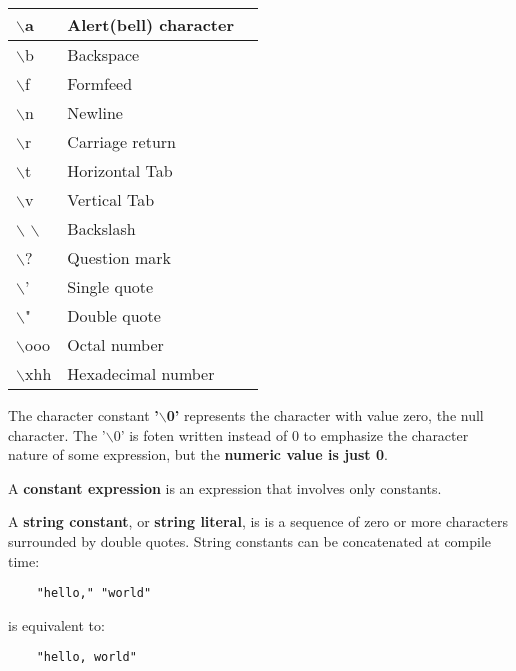 \documentclass{article}
\begin{document}
\begin{tabularx}{0.8\textwidth}{ 
  | >{\raggedright\arraybackslash}X 
  | >{\centering\arraybackslash}X 
  | >{\raggedleft\arraybackslash}X | }
  \hline
  $\backslash$a & Alert(bell) character \\
  \hline
  $\backslash$b & Backspace \\
  \hline
  $\backslash$f & Formfeed \\
  \hline
  $\backslash$n & Newline \\
  \hline
  $\backslash$r & Carriage return \\
  \hline
  $\backslash$t & Horizontal Tab\\
  \hline
  $\backslash$v & Vertical Tab \\
  \hline
  $\backslash$ $\backslash$ & Backslash \\
  \hline
  $\backslash$? & Question mark \\
  \hline
  $\backslash$' & Single quote \\
  \hline
  $\backslash$" & Double quote \\
  \hline
  $\backslash$ooo & Octal number \\
  \hline
  $\backslash$xhh & Hexadecimal number \\
  \hline
  
 \end{tabularx}

\vspace{8pt}
The character constant \textbf{'$\backslash$0'} represents the character with value zero, the null character. The '$\backslash$0' is foten written instead of 0 to emphasize the character nature of some expression, but the \textbf{numeric value is just 0}.

A \textbf{constant expression} is an expression that involves only constants.

\clearpage
A \textbf{string constant}, or \textbf{string literal}, is is a sequence of zero or more characters surrounded by double quotes.
String constants can be concatenated at compile time: 

\begin{lstlisting}
	"hello," "world"
\end{lstlisting}

\vspace{8pt}

is equivalent to:

\begin{lstlisting}
	"hello, world"
\end{lstlisting}
\end{document}
